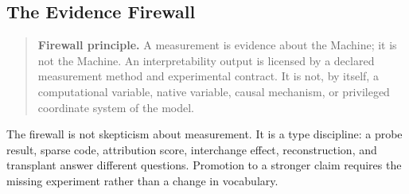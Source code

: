 \subsection{The Evidence Firewall}
\label{sec:firewall}

\begin{quote}
\textbf{Firewall principle.} A measurement is evidence about the Machine; it
is not the Machine. An interpretability output is licensed by a declared measurement method
and experimental contract. It is not, by itself, a computational variable, native
variable, causal mechanism, or privileged coordinate system of the model.
\end{quote}

The firewall is not skepticism about measurement. It is a type discipline: a probe result, sparse code, attribution score, interchange effect, reconstruction, and transplant answer different questions. Promotion to a stronger claim requires the missing experiment rather than a change in vocabulary.

